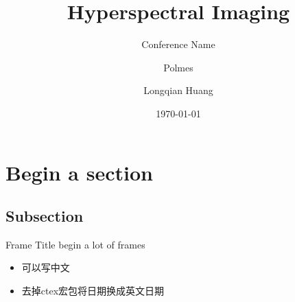 \documentclass{cubeamer}
\title{Hyperspectral Imaging}
\subtitle{Conference Name}
\author[Longqian Huang]{Polmes \and Longqian Huang} %
\date{\today} %
\institute[Zhejiang University]{Optical Science and Engineering}
\begin{document}
\maketitle

\cutoc

\section{Begin a section}
\subsection{Subsection}
\begin{frame}{Frame Title}
	begin a lot of frames
	
    \begin{itemize}
        \item 可以写中文
        \item 去掉ctex宏包将日期换成英文日期
    \end{itemize}
\end{frame}
\end{document}
